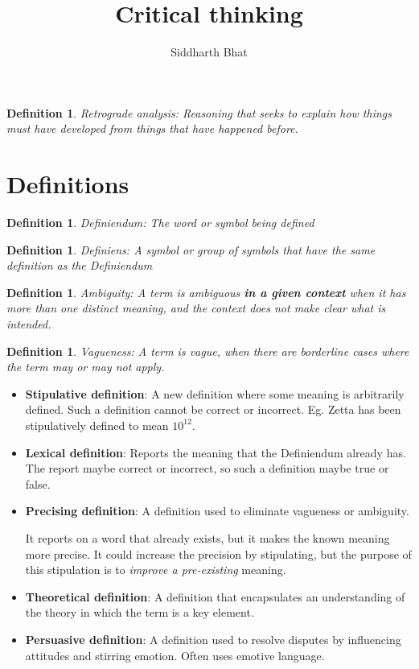 \documentclass[5pt]{book}
\title{Critical thinking}
\author{Siddharth Bhat}
\date{}
\newtheorem{definition}[theorem]{Definition}
\begin{document}
\maketitle
\tableofcontents

\begin{definition}
    Retrograde analysis: Reasoning that seeks to explain how things
    must have developed from things that have happened before.
\end{definition}

\section{Definitions}
\begin{definition}
    Definiendum: The word or symbol being defined
\end{definition}

\begin{definition}
    Definiens: A symbol or group of symbols that have the same definition
    as the Definiendum
\end{definition}

\begin{definition}
    Ambiguity: A term is ambiguous \textbf{in a given context} when it
    has more than one distinct meaning, and the context does not make clear
    what is intended.
\end{definition}

\begin{definition}
    Vagueness: A term is vague, when there are borderline cases where the
    term may or may not apply.
\end{definition}

\begin{itemize}
    \item \textbf{Stipulative definition}: A new definition where some meaning is
        arbitrarily defined. Such a definition cannot be correct or incorrect.
        Eg. Zetta has been stipulatively defined to mean $10^{12}$.
    \item \textbf{Lexical definition}: Reports the meaning that the Definiendum
        already has. The report maybe correct or incorrect, so such a definition
        maybe true or false.
    \item \textbf{Precising definition}: A definition used to eliminate 
        vagueness or ambiguity.

        It reports on a word that already exists, but it makes the known
        meaning more precise. It could increase the precision by stipulating,
        but the purpose of this stipulation is to \textit{improve a pre-existing}
        meaning.

    \item \textbf{Theoretical definition}: A definition that encapsulates
        an understanding of the theory in which the term is a key element.
    \item \textbf{Persuasive definition}: A definition used to resolve
        disputes  by influencing attitudes and stirring emotion. Often
        uses emotive language.
\end{itemize}
\end{document}
